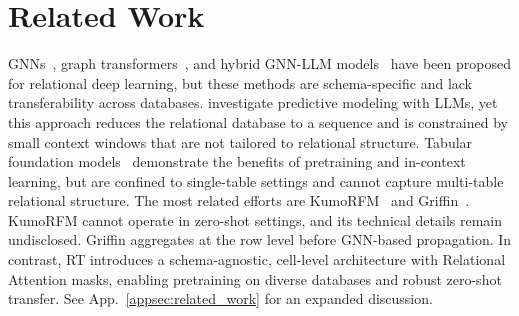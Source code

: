 \section{Related Work}
\label{sec:related_work}

GNNs~\citep{rdl,relbench,relgnn}, graph transformers~\citep{dbformer,relgt,dwivedi2025relational}, and hybrid GNN-LLM models~\citep{relllm} have been proposed for relational deep learning, but these methods are schema-specific and lack transferability across databases. \citet{snowflake2024relational} investigate predictive modeling with LLMs, yet this approach reduces the relational database to a sequence and is constrained by small context windows that are not tailored to relational structure. Tabular foundation models~\citep{tabpfn,tabicl,carte,portal,tabpfnv2} demonstrate the benefits of pretraining and in-context learning, but are confined to single-table settings and cannot capture multi-table relational structure. The most related efforts are KumoRFM~\citep{kumorfm} and Griffin~\citep{griffin}. KumoRFM cannot operate in zero-shot settings, and its technical details remain undisclosed. Griffin aggregates at the row level before GNN-based propagation. In contrast, RT introduces a schema-agnostic, cell-level architecture with Relational Attention masks, enabling pretraining on diverse databases and robust zero-shot transfer.
See App.~\ref{appsec:related_work} for an expanded discussion.


